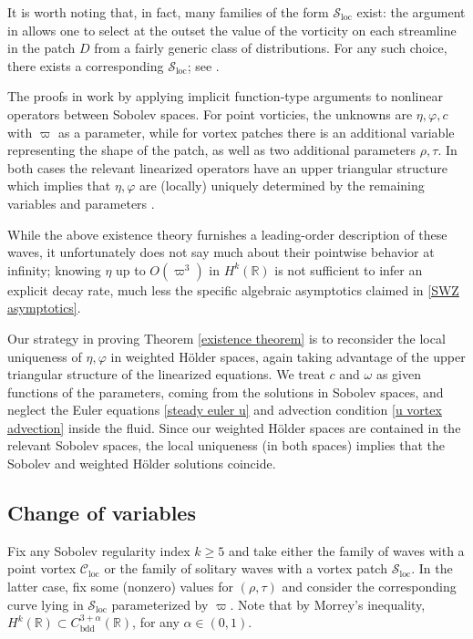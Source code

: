 \documentclass[11pt,reqno]{amsart}
\newcommand\bdd{{\mathrm{bdd}}}
\newcommand{\R}{\mathbb{R}}
\theoremstyle{plain}
\theoremstyle{remark}
\numberwithin{equation}{section}
\begin{document}
It is worth noting that, in fact, many families of the form $\mathscr{S}_{\mathrm{loc}}$ exist:  the argument in \cite{shatah2013travelling} allows one to select at the outset the value of the vorticity on each streamline in the patch $D$ from a fairly generic class of distributions.  For any such choice, there exists a corresponding $\mathscr{S}_{\mathrm{loc}}$; see \cite[Remark 2.2(b)]{shatah2013travelling}.  

The proofs in \cite{shatah2013travelling} work by applying implicit function-type arguments to nonlinear operators between Sobolev spaces. For point vorticies, the unknowns are $\eta,\varphi,c$ with $\varpi$ as a parameter, while for vortex patches there is an additional variable representing the shape of the patch, as well as two additional parameters $\rho,\tau$. In both cases the relevant linearized operators have an upper triangular structure which implies that $\eta,\varphi$ are (locally) uniquely determined by the remaining variables and parameters \cite[Lemma~4.1 and the proof of Theorem~2.1]{shatah2013travelling}.

While the above existence theory furnishes a leading-order description of these waves, it unfortunately does not say much about their pointwise behavior at infinity; knowing $\eta$ up to $O(\varpi^3)$ in $H^k(\R)$ is not sufficient to infer an explicit decay rate, much less the specific algebraic asymptotics claimed in \eqref{SWZ asymptotics}.

Our strategy in proving Theorem \ref{existence theorem} is to reconsider the local uniqueness of $\eta,\varphi$ in weighted H\"older spaces, again taking advantage of the upper triangular structure of the linearized equations. We treat $c$ and $\omega$ as given functions of the parameters, coming from the solutions in Sobolev spaces, and neglect the Euler equations \eqref{steady euler u} and advection condition \eqref{u vortex advection} inside the fluid. Since our weighted H\"older spaces are contained in the relevant Sobolev spaces, the local uniqueness (in both spaces) implies that the Sobolev and weighted H\"older solutions coincide. 


\subsection{Change of variables} 
Fix any Sobolev regularity index  $k \geq 5$ and take either the family of waves with a point vortex $\mathscr{C}_{\mathrm{loc}}$ or the family of solitary waves with a vortex patch $\mathscr{S}_{\mathrm{loc}}$.  In the latter case, fix some (nonzero) values for $(\rho, \tau)$ and consider the corresponding curve lying in $\mathscr{S}_{\mathrm{loc}}$ parameterized by $\varpi$.  Note that by Morrey's inequality, $H^k(\R) \subset C^{3+\alpha}_\bdd(\R)$, for any $\alpha \in (0,1)$.
\end{document}
